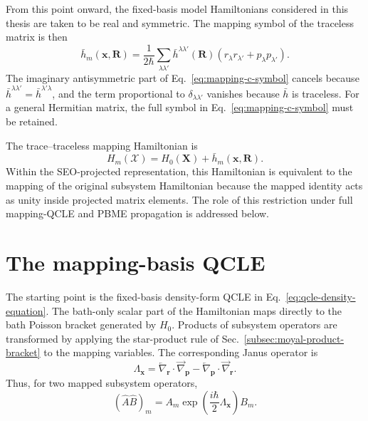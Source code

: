 \documentclass[
  11pt,
  letterpaper,
  onehalfspacing,
  normalmargins,
  equalmargins,
  oneside
]{ut-thesis}
\begin{document}
From this point onward, the fixed-basis model Hamiltonians considered in this
thesis are taken to be real and symmetric. The mapping symbol of the traceless
matrix is then
\begin{equation}
\bar h_m(\mathbf x,\mathbf R)
=
\frac{1}{2\hbar}
\sum_{\lambda\lambda'}
\bar h^{\lambda\lambda'}(\mathbf R)
\left(
 r_\lambda r_{\lambda'}
+
 p_\lambda p_{\lambda'}
\right).
\label{eq:trace-traceless-hm-real}
\end{equation}
The imaginary antisymmetric part of
Eq.~\eqref{eq:mapping-c-symbol} cancels because
\(\bar h^{\lambda\lambda'}=\bar h^{\lambda'\lambda}\), and the term
proportional to \(\delta_{\lambda\lambda'}\) vanishes because \(\bar h\) is
traceless. For a general Hermitian matrix, the full symbol in
Eq.~\eqref{eq:mapping-c-symbol} must be retained.

The trace--traceless mapping Hamiltonian is
\begin{equation}
H_m(\boldsymbol{\mathcal X})
=
H_0(\mathbf X)
+
\bar h_m(\mathbf x,\mathbf R).
\label{eq:trace-traceless-mapping-hamiltonian}
\end{equation}
Within the SEO-projected representation, this Hamiltonian is equivalent to the
mapping of the original subsystem Hamiltonian because the mapped identity acts
as unity inside projected matrix elements. The role of this restriction under
full mapping-QCLE and PBME propagation is addressed below.


\section{The mapping-basis QCLE}
\label{sec:mapping-basis-qcle}

The starting point is the fixed-basis density-form QCLE in
Eq.~\eqref{eq:qcle-density-equation}. The bath-only scalar part of the
Hamiltonian maps directly to the bath Poisson bracket generated by \(H_0\).
Products of subsystem operators are transformed by applying the star-product
rule of Sec.~\ref{subsec:moyal-product-bracket} to the mapping variables. The
corresponding Janus operator is
\begin{equation}
\Lambda_{\mathbf x}
=
\overleftarrow{\nabla}_{\mathbf r}\cdot
\overrightarrow{\nabla}_{\mathbf p}
-
\overleftarrow{\nabla}_{\mathbf p}\cdot
\overrightarrow{\nabla}_{\mathbf r}.
\label{eq:mapping-janus-operator}
\end{equation}
Thus, for two mapped subsystem operators,
\begin{equation}
(\hat A\hat B)_m
=
A_m
\exp\left(
\frac{i\hbar}{2}\Lambda_{\mathbf x}
\right)
B_m.
\label{eq:mapping-moyal-product-qcle}
\end{equation}
\end{document}
